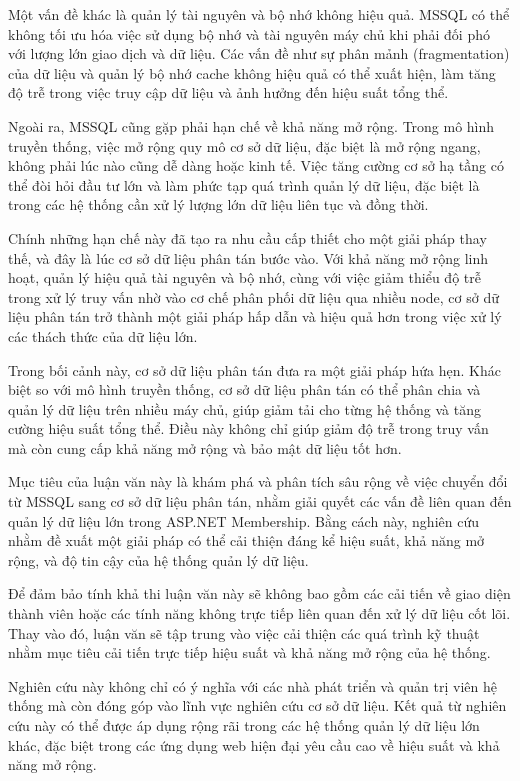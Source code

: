 \documentclass{article}[13pt]
\begin{document}
Một vấn đề khác là quản lý tài nguyên và bộ nhớ không hiệu quả. MSSQL có thể không tối ưu hóa việc sử dụng bộ nhớ và tài nguyên máy chủ khi phải đối phó với lượng lớn giao dịch và dữ liệu. Các vấn đề như sự phân mảnh (fragmentation) của dữ liệu và quản lý bộ nhớ cache không hiệu quả có thể xuất hiện, làm tăng độ trễ trong việc truy cập dữ liệu và ảnh hưởng đến hiệu suất tổng thể.

Ngoài ra, MSSQL cũng gặp phải hạn chế về khả năng mở rộng. Trong mô hình truyền thống, việc mở rộng quy mô cơ sở dữ liệu, đặc biệt là mở rộng ngang, không phải lúc nào cũng dễ dàng hoặc kinh tế. Việc tăng cường cơ sở hạ tầng có thể đòi hỏi đầu tư lớn và làm phức tạp quá trình quản lý dữ liệu, đặc biệt là trong các hệ thống cần xử lý lượng lớn dữ liệu liên tục và đồng thời.

Chính những hạn chế này đã tạo ra nhu cầu cấp thiết cho một giải pháp thay thế, và đây là lúc cơ sở dữ liệu phân tán bước vào. Với khả năng mở rộng linh hoạt, quản lý hiệu quả tài nguyên và bộ nhớ, cùng với việc giảm thiểu độ trễ trong xử lý truy vấn nhờ vào cơ chế phân phối dữ liệu qua nhiều node, cơ sở dữ liệu phân tán trở thành một giải pháp hấp dẫn và hiệu quả hơn trong việc xử lý các thách thức của dữ liệu lớn.

Trong bối cảnh này, cơ sở dữ liệu phân tán đưa ra một giải pháp hứa hẹn. Khác biệt so với mô hình truyền thống, cơ sở dữ liệu phân tán có thể phân chia và quản lý dữ liệu trên nhiều máy chủ, giúp giảm tải cho từng hệ thống và tăng cường hiệu suất tổng thể. Điều này không chỉ giúp giảm độ trễ trong truy vấn mà còn cung cấp khả năng mở rộng và bảo mật dữ liệu tốt hơn.

Mục tiêu của luận văn này là khám phá và phân tích sâu rộng về việc chuyển đổi từ MSSQL sang cơ sở dữ liệu phân tán, nhằm giải quyết các vấn đề liên quan đến quản lý dữ liệu lớn trong ASP.NET Membership. Bằng cách này, nghiên cứu nhằm đề xuất một giải pháp có thể cải thiện đáng kể hiệu suất, khả năng mở rộng, và độ tin cậy của hệ thống quản lý dữ liệu.

Để đảm bảo tính khả thi luận văn này sẽ không bao gồm các cải tiến về giao diện thành viên hoặc các tính năng không trực tiếp liên quan đến xử lý dữ liệu cốt lõi. Thay vào đó, luận văn sẽ tập trung vào việc cải thiện các quá trình kỹ thuật nhằm mục tiêu cải tiến trực tiếp hiệu suất và khả năng mở rộng của hệ thống.


Nghiên cứu này không chỉ có ý nghĩa với các nhà phát triển và quản trị viên hệ thống mà còn đóng góp vào lĩnh vực nghiên cứu cơ sở dữ liệu. Kết quả từ nghiên cứu này có thể được áp dụng rộng rãi trong các hệ thống quản lý dữ liệu lớn khác, đặc biệt trong các ứng dụng web hiện đại yêu cầu cao về hiệu suất và khả năng mở rộng.
\end{document}
